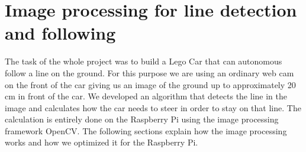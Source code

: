 \documentclass[11pt,twocolumn]{article}
\begin{document}
\section{Image processing for line detection and following}
\label{ImProLinFol}
The task of the whole project was to build a Lego Car that can autonomous follow a line on the ground. For this purpose we are using an ordinary web cam on the front of the car giving us an image of the ground up to approximately 20 cm in front of the car. We developed an algorithm that detects the line in the image and calculates how the car needs to steer in order to stay on that line. The calculation is entirely done on the Raspberry Pi using the image processing framework OpenCV. The following sections explain how the image processing works and how we optimized it for the Raspberry Pi.


\end{document}
